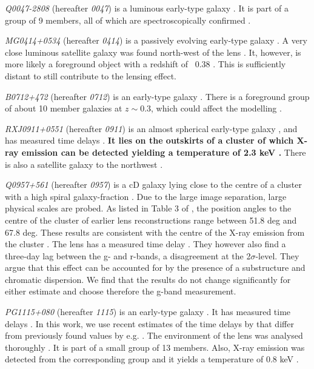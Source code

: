 \documentclass[useAMS,usenatbib]{mn2e}
\newcommand{\cb}[1]{{\color{red} \textbf{#1}}}
\begin{document}
\textit{Q0047-2808} (hereafter \textit{0047}) is a luminous early-type galaxy \citep{1996MNRAS.278..139W}. It is part of a group of 9 members, all of which are spectroscopically confirmed \citep{2011ApJ...726...84W}.

\textit{MG0414+0534} (hereafter \textit{0414}) is a passively evolving early-type galaxy \citep{1999AJ....117.2034T}. A very close luminous satellite galaxy was found north-west of the lens \citep{1993AJ....105....1S}. It, however, is more likely a foreground object with a redshift of ~0.38 \citep{2011MNRAS.413L..86C}. This is sufficiently distant to still contribute to the lensing effect.

\textit{B0712+472} (hereafter \textit{0712}) is an early-type galaxy \citep{1998MNRAS.296..483J,1998AJ....115..377F}. There is a foreground group of about 10 member galaxies at $z\sim0.3$, which could affect the modelling \citep{2002AJ....123..627F}.

\textit{RXJ0911+0551} (hereafter \textit{0911}) is an almost spherical early-type galaxy \citep{1997A&A...317L..13B,2012A&A...538A..99S}, and has measured time delays \citep{2002ApJ...572L..11H}. \cb{It lies on the outskirts of a cluster of which X-ray emission can be detected yielding a temperature of 2.3 keV \citep{2001ApJ...555....1M}.} There is also a satellite galaxy to the northwest \citep{2000ApJ...544L..35K}.

\textit{Q0957+561} (hereafter \textit{0957}) is a cD galaxy lying close to the centre of a cluster with a high spiral galaxy-fraction \citep[e.g.][]{1992MNRAS.254P..27G,1994A&A...291..411A,1998ApJ...504..661C}. Due to the large image separation, large physical scales are probed. As listed in Table 3 of \cite{2000ApJ...542...74K}, the position angles to the centre of the cluster of earlier lens reconstructions range between 51.8 deg and 67.8 deg. These results are consistent with the centre of the X-ray emission from the cluster \citep{1998ApJ...504..661C}. The lens has a measured time delay \citep[e.g.][]{2012A&A...540A.132S}. They however also find a three-day lag between the g- and r-bands, a disagreement at the 2$\sigma$-level. They argue that this effect can be accounted for by the presence of a substructure and chromatic dispersion. We find that the results do not change significantly for either estimate and choose therefore the g-band measurement.

\textit{PG1115+080} (hereafter \textit{1115}) is an early-type galaxy \citep{1980Natur.285..641W,2005ApJ...626...51Y}. It has measured time delays \citep[see e.g.][]{1997ApJ...475L..85S}. In this work, we use recent estimates of the time delays by \cite{2010MNRAS.406.2764T} that differ from previously found values by e.g. \cite{1997ApJ...489...21B}. The environment of the lens was analysed thoroughly \citep{2006ApJ...641..169M,2011ApJ...726...84W}. It is part of a small group of 13 members. Also, X-ray emission was detected from the corresponding group and it yields a temperature of 0.8 keV \citep{2004ApJ...610..686G}.
\end{document}
